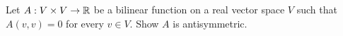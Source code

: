 \begin{exercise}
  \label{ex:hw05:bilinear-antisymmetry}
  Let \(A:V\times V\to\mathbb{R}\) be a bilinear function on a real vector
  space \(V\) such that \(A(v,v)=0\) for every \(v\in V\).
  Show \(A\) is antisymmetric.
\end{exercise}
